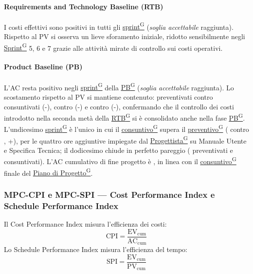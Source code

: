 \documentclass[a4paper,12pt]{article}
\providecommand{\glslink}[2]{\href{https://alittlebyte-19.github.io/Documentazione/glossario.html\#gls-#1}{\underline{#2}\textsuperscript{\scriptsize G}}}
\begin{document}
\paragraph*{Requirements and Technology Baseline (RTB)} I costi effettivi sono positivi in tutti gli \glslink{sprint}{sprint} (\emph{soglia accettabile} raggiunta). Rispetto al PV si osserva un lieve sforamento iniziale, ridotto sensibilmente negli \glslink{sprint}{Sprint} 5, 6 e 7 grazie alle attività mirate di controllo sui costi operativi.

\paragraph*{Product Baseline (PB)} L'AC resta positivo negli \glslink{sprint}{sprint} della \glslink{pb-product-baseline}{PB} (\emph{soglia accettabile} raggiunta). Lo scostamento rispetto al PV si mantiene contenuto:  preventivati contro  consuntivati (-),  contro  (-) e  contro  (-), confermando che il controllo dei costi introdotto nella seconda metà della \glslink{rtb-requirements-and-technology-baseline}{RTB} si è consolidato anche nella fase \glslink{pb-product-baseline}{PB}. L'undicesimo \glslink{sprint}{sprint} è l'unico in cui il \glslink{consuntivo}{consuntivo} supera il \glslink{preventivo}{preventivo} ( contro , +), per le quattro ore aggiuntive impiegate dal \glslink{progettista}{Progettista} su Manuale Utente e Specifica Tecnica; il dodicesimo chiude in perfetto pareggio ( preventivati e consuntivati). L'AC cumulativo di fine progetto è , in linea con il \glslink{consuntivo}{consuntivo} finale del \glslink{piano-di-progetto}{Piano di Progetto}.

\subsubsection{MPC-CPI e MPC-SPI — Cost Performance Index e Schedule Performance Index}

Il Cost Performance Index misura l'efficienza dei costi:
\[
  \text{CPI} = \frac{\text{EV}_\text{cum}}{\text{AC}_\text{cum}}
\]
Lo Schedule Performance Index misura l'efficienza del tempo:
\[
  \text{SPI} = \frac{\text{EV}_\text{cum}}{\text{PV}_\text{cum}}
\]
\end{document}
